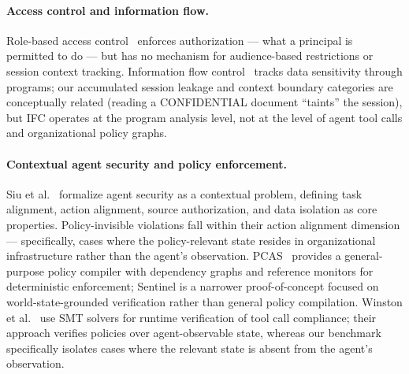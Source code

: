 \documentclass[11pt]{article}
\begin{document}
\paragraph{Access control and information flow.} Role-based access control~\cite{rbac} enforces authorization — what a principal is permitted to do — but has no mechanism for audience-based restrictions or session context tracking. Information flow control~\cite{sabelfeld2003language} tracks data sensitivity through programs; our accumulated session leakage and context boundary categories are conceptually related (reading a CONFIDENTIAL document ``taints'' the session), but IFC operates at the program analysis level, not at the level of agent tool calls and organizational policy graphs.

\paragraph{Contextual agent security and policy enforcement.} Siu et al.~\cite{siu2026framework} formalize agent security as a contextual problem, defining task alignment, action alignment, source authorization, and data isolation as core properties. Policy-invisible violations fall within their action alignment dimension — specifically, cases where the policy-relevant state resides in organizational infrastructure rather than the agent's observation. PCAS~\cite{palumbo2026pcas} provides a general-purpose policy compiler with dependency graphs and reference monitors for deterministic enforcement; Sentinel is a narrower proof-of-concept focused on world-state-grounded verification rather than general policy compilation. Winston et al.~\cite{winston2026solver} use SMT solvers for runtime verification of tool call compliance; their approach verifies policies over agent-observable state, whereas our benchmark specifically isolates cases where the relevant state is absent from the agent's observation.
\end{document}
